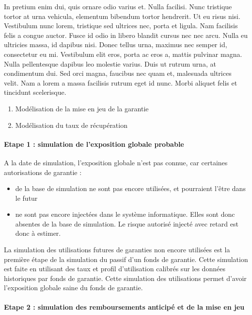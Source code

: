 \documentclass[12pt,a4paper]{report}
\begin{document}
In pretium enim dui, quis ornare odio varius et. Nulla facilisi. Nunc tristique tortor at urna vehicula, elementum bibendum tortor hendrerit. Ut eu risus nisi. Vestibulum nunc lorem, tristique sed ultrices nec, porta et ligula. Nam facilisis felis a congue auctor. Fusce id odio in libero blandit cursus nec nec arcu. Nulla eu ultricies massa, id dapibus nisi. Donec tellus urna, maximus nec semper id, consectetur eu mi. Vestibulum elit eros, porta ac eros a, mattis pulvinar magna. Nulla pellentesque dapibus leo molestie varius. Duis ut rutrum urna, at condimentum dui. Sed orci magna, faucibus nec quam et, malesuada ultrices velit. Nam a lorem a massa facilisis rutrum eget id nunc. Morbi aliquet felis et tincidunt scelerisque. 

\begin{enumerate}
    \item Modélisation de la mise en jeu de la garantie
    \item Modélisation du taux de récupération
\end{enumerate}

\paragraph{Etape 1 : simulation de l'exposition globale probable}
A la date de simulation, l’exposition globale n’est pas connue, car certaines autorisations de garantie :

\begin{itemize}
    \item de la base de simulation ne sont pas encore utilisées, et pourraient l’être dans le futur
    \item 	ne sont pas encore injectées dans le système informatique. Elles sont donc absentes de la base de simulation. Le risque autorisé injecté avec retard est donc à estimer.
\end{itemize}


La simulation des utilisations futures de garanties non encore utilisées est la première étape de la simulation du passif d’un fonds de garantie. Cette simulation est faite en utilisant des taux et profil d’utilisation calibrés sur les données historiques par fonds de garantie.  Cette simulation des utilisations permet d’avoir l’exposition globale saine du fonds de garantie.

\paragraph{Etape 2 : simulation des remboursements anticipé et de la mise en jeu}
\end{document}
